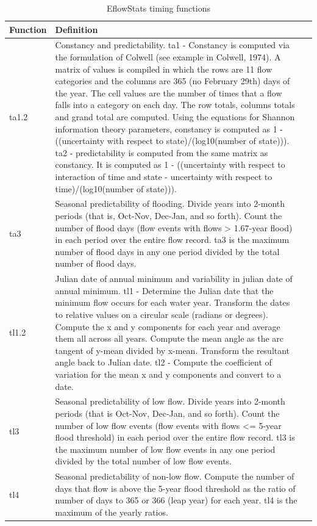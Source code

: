 \documentclass[a4paper,11pt]{article}\usepackage[]{graphicx}\usepackage[]{color}
\begin{document}
\begin{table}[ht]
  \centering
  \begin{threeparttable}[b]
  \caption{EflowStats timing functions}
  \label{tab:timStats}
\begin{tabularx}{\textwidth}{lXl}
  \hline
\textbf{Function} & \textbf{Definition} \\ 
  \hline
  ta1.2 & Constancy and predictability. ta1 - Constancy is computed via the formulation of Colwell (see example in Colwell, 1974). A matrix of values is compiled in which the rows are 11 flow categories and the columns are 365 (no February 29th) days of the year. The cell values are the number of times that a flow falls into a category on each day. The row totals, columns totals and grand total are computed. Using the equations for Shannon information theory parameters, constancy is computed as 1 - ((uncertainty with respect to state)/(log10(number of state))). ta2 - predictability is computed from the same matrix as constancy. It is computed as 1 - ((uncertainty with respect to interaction of time and state - uncertainty with respect to time)/(log10(number of state))). \\
  ta3 & Seasonal predictability of flooding. Divide years into 2-month periods (that is, Oct-Nov, Dec-Jan, and so forth). Count the number of flood days (flow events with flows > 1.67-year flood) in each period over the entire flow record. ta3 is the maximum number of flood days in any one period divided by the total number of flood days. \\
  tl1.2 & Julian date of annual minimum and variability in julian date of annual minimum. tl1 - Determine the Julian date that the minimum flow occurs for each water year. Transform the dates to relative values on a circular scale (radians or degrees). Compute the x and y components for each year and average them all across all years. Compute the mean angle as the arc tangent of y-mean divided by x-mean. Transform the resultant angle back to Julian date. tl2 - Compute the coefficient of variation for the mean x and y components and convert to a date. \\
  tl3 & Seasonal predictability of low flow. Divide years into 2-month periods (that is Oct-Nov, Dec-Jan, and so forth). Count the number of low flow events (flow events with flows <= 5-year flood threshold) in each period over the entire flow record. tl3 is the maximum number of low flow events in any one period divided by the total number of low flow events. \\
  tl4 & Seasonal predictability of non-low flow. Compute the number of days that flow is above the 5-year flood threshold as the ratio of number of days to 365 or 366 (leap year) for each year. tl4 is the maximum of the yearly ratios. \\

\end{tabularx}
\end{threeparttable}
\end{table}
\end{document}
